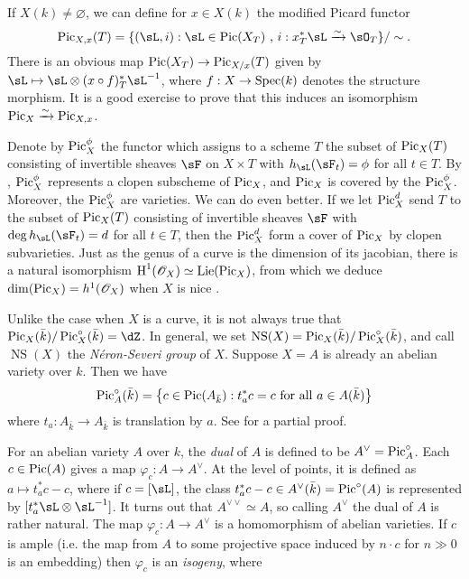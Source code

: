 If $X(k)\ne \varnothing$, we can define for $x\in X(k)$ the modified Picard 
functor 
\[
  \picard_{X,x}(T) = \{(\sL,i):\sL\in \picard(X_T)\text{ , }i:x_T^\ast \sL \xrightarrow\sim \sO_T\} /\sim \text{.}
\]
There is an obvious map $\operatorname{Pic}(X_T) \to \operatorname{Pic}_{X/x}(T)$ given by 
$\sL\mapsto\sL\otimes (x\circ f)_T^\ast \sL^{-1}$, where $f:X\to \operatorname{Spec}(k)$ 
denotes the structure morphism. It is a good exercise to prove that this 
induces an isomorphism $\operatorname{Pic}_X \xrightarrow\sim \operatorname{Pic}_{X,x}$. 

Denote by 
$\operatorname{Pic}_X^\phi$ the functor which assigns to a scheme $T$ the subset of 
$\operatorname{Pic}_X(T)$ consisting of invertible sheaves $\sF$ on $X\times T$ with 
$h_\sL(\sF_t) = \phi$ for all $t\in T$. By \cite[6.20]{kl05}, 
$\operatorname{Pic}_X^\phi$ represents a clopen subscheme of $\operatorname{Pic}_X$, and $\operatorname{Pic}_X$ is 
covered by the $\operatorname{Pic}_X^\phi$. Moreover, the $\operatorname{Pic}_X^\phi$ are varieties. We can 
do even better. If we let $\operatorname{Pic}_X^d$ send $T$ to the subset of $\operatorname{Pic}_X(T)$ 
consisting of invertible sheaves $\sF$ with 
$\deg h_\sL(\sF_t) = d$ for all $t\in T$, then the 
$\operatorname{Pic}_X^d$ form a cover of $\operatorname{Pic}_X$ by clopen subvarieties. Just as the genus 
of a curve is the dimension of its jacobian, there is a natural isomorphism 
$\operatorname{H}^1(\mathscr{O}_X) \simeq \operatorname{Lie}(\operatorname{Pic}_X)$, from which we deduce 
$\dim(\operatorname{Pic}_X) = h^1(\mathscr{O}_X)$ when $X$ is nice \cite[5.11]{kl05}.

Unlike the case when $X$ is a curve, it is not always true that 
$\picard_X(\bar k)/\picard_X^\circ(\bar k) = \dZ$. In general, we set 
$\operatorname{NS}(X) = \operatorname{Pic}_X(\bar k) / \operatorname{Pic}_X^\circ(\bar k)$, and call 
$\operatorname{NS}(X)$ the \emph{N\'eron-Severi group} of $X$. 
Suppose $X=A$ is already an abelian variety over $k$. Then we have 
\[
  \operatorname{Pic}_A^\circ(\bar k) = \left\{c\in \operatorname{Pic}(A_{\bar k}) : t_a^* c = c\text{ for all }a\in A(\bar k)\right\} 
\]
where $t_a:A_{\bar k}\to A_{\bar k}$ is translation by $a$. See 
\cite[I.8.4]{mi-av} for a partial proof. 

For an abelian variety $A$ over $k$, 
the \emph{dual} of $A$ is defined to be $A^\vee = \operatorname{Pic}_A^\circ$. 
Each $c\in \operatorname{Pic}(A)$ gives a map $\varphi_c:A\to A^\vee$. At the level of 
points, it is defined as $a\mapsto t_a^* c - c$, where if $c=[\sL]$, 
the class $t_a^*c - c\in A^\vee(\bar k) = \operatorname{Pic}^\circ(A)$ is represented by 
$[t_a^*\sL\otimes\sL^{-1}]$. 
It turns out that $A^{\vee\vee} \simeq A$, so calling $A^\vee$ the dual of $A$ 
is rather natural. The map $\varphi_c:A\to A^\vee$ is a homomorphism of abelian 
varieties. If $c$ is ample (i.e. the map from $A$ to some projective space 
induced by $n\cdot c$ for $n\gg 0$ is an embedding) then $\varphi_c$ is an 
\emph{isogeny}, where 

